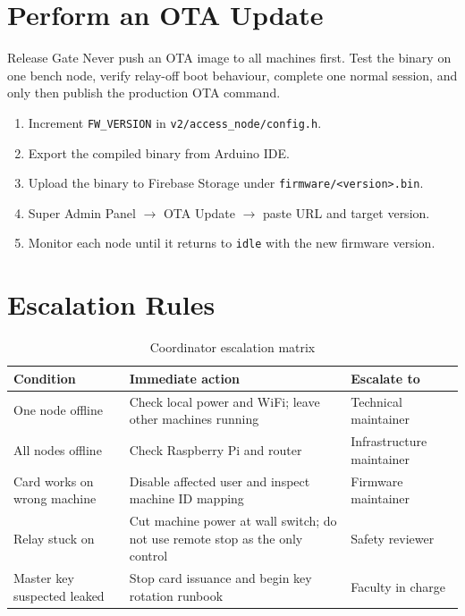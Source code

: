 \section{Perform an OTA Update}

\begin{runbookbox}{Release Gate}
Never push an OTA image to all machines first. Test the binary on one bench node, verify relay-off boot behaviour, complete one normal session, and only then publish the production OTA command.
\end{runbookbox}

\begin{enumerate}[leftmargin=1.5em]
    \item Increment \texttt{FW\_VERSION} in \texttt{v2/access\_node/config.h}.
    \item Export the compiled binary from Arduino IDE.
    \item Upload the binary to Firebase Storage under \texttt{firmware/<version>.bin}.
    \item Super Admin Panel $\rightarrow$ OTA Update $\rightarrow$ paste URL and target version.
    \item Monitor each node until it returns to \texttt{idle} with the new firmware version.
\end{enumerate}

\section{Escalation Rules}

\begin{table}[H]
\centering
\caption{Coordinator escalation matrix}
\begin{tabular}{L{4cm}L{5.5cm}L{4.5cm}}
\toprule
\textbf{Condition} & \textbf{Immediate action} & \textbf{Escalate to} \\
\midrule
One node offline & Check local power and WiFi; leave other machines running & Technical maintainer \\
All nodes offline & Check Raspberry Pi and router & Infrastructure maintainer \\
Card works on wrong machine & Disable affected user and inspect machine ID mapping & Firmware maintainer \\
Relay stuck on & Cut machine power at wall switch; do not use remote stop as the only control & Safety reviewer \\
Master key suspected leaked & Stop card issuance and begin key rotation runbook & Faculty in charge \\
\bottomrule
\end{tabular}
\end{table}

